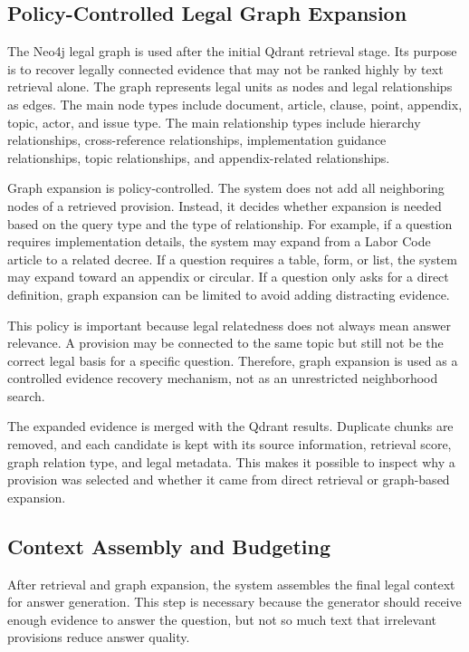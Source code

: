 \subsection{Policy-Controlled Legal Graph Expansion}
The Neo4j legal graph is used after the initial Qdrant retrieval stage. Its purpose is to recover legally connected evidence that may not be ranked highly by text retrieval alone. The graph represents legal units as nodes and legal relationships as edges. The main node types include document, article, clause, point, appendix, topic, actor, and issue type. The main relationship types include hierarchy relationships, cross-reference relationships, implementation guidance relationships, topic relationships, and appendix-related relationships.

Graph expansion is policy-controlled. The system does not add all neighboring nodes of a retrieved provision. Instead, it decides whether expansion is needed based on the query type and the type of relationship. For example, if a question requires implementation details, the system may expand from a Labor Code article to a related decree. If a question requires a table, form, or list, the system may expand toward an appendix or circular. If a question only asks for a direct definition, graph expansion can be limited to avoid adding distracting evidence.

This policy is important because legal relatedness does not always mean answer relevance. A provision may be connected to the same topic but still not be the correct legal basis for a specific question. Therefore, graph expansion is used as a controlled evidence recovery mechanism, not as an unrestricted neighborhood search.

The expanded evidence is merged with the Qdrant results. Duplicate chunks are removed, and each candidate is kept with its source information, retrieval score, graph relation type, and legal metadata. This makes it possible to inspect why a provision was selected and whether it came from direct retrieval or graph-based expansion.

\subsection{Context Assembly and Budgeting}
After retrieval and graph expansion, the system assembles the final legal context for answer generation. This step is necessary because the generator should receive enough evidence to answer the question, but not so much text that irrelevant provisions reduce answer quality.

